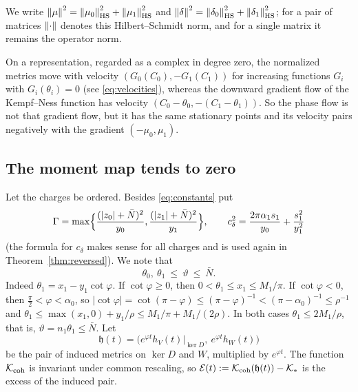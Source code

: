 We write
$\left\lVert\mu\right\rVert^2=\left\lVert\mu_0\right\rVert_{\mathrm{HS}}^2+\left\lVert\mu_1\right\rVert_{\mathrm{HS}}^2$ and
$\left\lVert\delta\right\rVert^2=\left\lVert\delta_0\right\rVert_{\mathrm{HS}}^2+\left\lVert\delta_1\right\rVert_{\mathrm{HS}}^2$; for a pair of
matrices $\left\lVert\cdot\right\rVert$ denotes this Hilbert--Schmidt norm, and for a single
matrix it remains the operator norm.

On a representation, regarded as a complex in degree zero, the normalized
metrics move with velocity $(G_0(C_0),-G_1(C_1))$ for increasing functions
$G_i$ with $G_i(\theta_i)=0$ (see \eqref{eq:velocities}), whereas the downward
gradient flow of the Kempf--Ness function has velocity
$(C_0-\theta_0,-(C_1-\theta_1))$. So the phase flow is not that gradient flow,
but it has the same stationary points and its velocity pairs negatively with
the gradient $(-\mu_0,\mu_1)$.

\subsection{The moment map tends to zero}
Let the charges be ordered. Besides \eqref{eq:constants} put
\[
 \Gamma=\max\Bigl\{\frac{(|z_0|+\bar N)^2}{y_0},\frac{(|z_1|+\bar N)^2}{y_1}\Bigr\},\qquad
 c_\delta^2=\frac{2\pi\alpha_1s_1}{y_0}+\frac{s_1^2}{y_1^2}
\]
(the formula for $c_\delta$ makes sense for all charges and is used again in
Theorem~\ref{thm:reversed}). We note that
\begin{equation}\label{eq:thetabound}
 \theta_0,\ \theta_1\ \leq\ \vartheta\ \leq\ \bar N .
\end{equation}
Indeed $\theta_1=x_1-y_1\cot\varphi$. If $\cot\varphi\geq0$, then
$0<\theta_1\leq x_1\leq M_1/\pi$. If $\cot\varphi<0$, then
$\frac\pi2<\varphi<\alpha_0$, so
$|\cot\varphi|=\cot(\pi-\varphi)\leq(\pi-\varphi)^{-1}<(\pi-\alpha_0)^{-1}\leq\rho^{-1}$
and $\theta_1\leq\max(x_1,0)+y_1/\rho\leq M_1/\pi+M_1/(2\rho)$. In both cases
$\theta_1\leq2M_1/\rho$, that is, $\vartheta=n_1\theta_1\leq\bar N$. Let
\[
 \mathfrak h(t)=\bigl(e^{\varphi t}h_V(t)|_{\ker D},\ e^{\varphi t}h_W(t)\bigr)
\]
be the pair of induced metrics on $\ker D$ and $W$, multiplied by
$e^{\varphi t}$. The function $\mathcal K_{\mathrm{coh}}$ is invariant under common rescaling, so
$\mathcal E(t):=\mathcal K_{\mathrm{coh}}(\mathfrak h(t))-\mathcal K_*$ is the excess of the induced pair.

